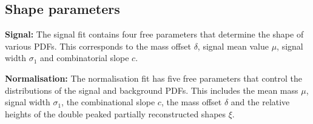 \subsection{Shape parameters}
\begin{description}
\item \textbf{Signal:} The signal fit contains four free parameters that determine the shape of various PDFs. This corresponds to the mass offset $\delta$, signal mean value $\mu$, signal width $\sigma_{1}$ and combinatorial slope $c$.
\item \textbf{Normalisation:} The normalisation fit has five free parameters that control the distributions of the signal and background PDFs. This includes the mean \Bp mass $\mu$, signal width $\sigma_{1}$, the combinational slope $c$, the mass offset $\delta$ and the relative heights of the double peaked partially reconstructed shapes $\xi$.   
\end{description}

